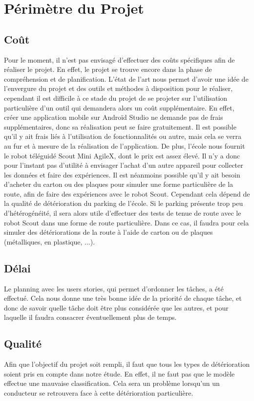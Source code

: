 \section{Périmètre du Projet}

\subsection{Coût}
Pour le moment, il n'est pas envisagé d'effectuer des coûts spécifiques afin de
réaliser le projet. En effet,
le projet se trouve encore dans la phase de compréhension et de planification.
L'état de l'art nous permet
d'avoir une idée de l'envergure du projet et des outils et méthodes à
disposition pour le réaliser, cependant
il est difficile à ce stade du projet de se projeter sur l'utilisation
particulière d'un outil qui demandera alors
un coût supplémentaire.
En effet, créer une application mobile sur Androïd Studio ne demande pas de
frais supplémentaires, donc
sa réalisation peut se faire gratuitement. Il est possible qu'il y ait frais
liés à l'utilisation de fonctionnalités
ou autre, mais cela se verra au fur et à mesure de la réalisation de
l'application.
De plus, l'école nous fournit le robot téléguidé Scout Mini AgileX, dont le
prix est assez élevé. Il n'y a
donc pour l'instant pas d'utilité à envisager l'achat d'un autre appareil pour
collecter les données et faire
des expériences.
Il est néanmoins possible qu'il y ait besoin d'acheter du carton ou des plaques
pour simuler une forme
particulière de la route, afin de faire des expériences avec le robot Scout.
Cependant cela dépend de la
qualité de détérioration du parking de l'école. Si le parking présente trop peu
d'hétérogénéité, il sera alors
utile d'effectuer des tests de tenue de route avec le robot Scout dans une
forme de route particulière. Dans
ce cas, il faudra pour cela simuler des détériorations de la route à l'aide de
carton ou de plaques
(métalliques, en plastique, ...).
\subsection{Délai}
Le planning avec les users stories, qui permet d'ordonner les tâches, a été
effectué. Cela nous donne une
très bonne idée de la priorité de chaque tâche, et donc de savoir quelle tâche
doit être plus considérée que
les autres, et pour laquelle il faudra consacrer éventuellement plus de temps.
\subsection{Qualité}
Afin que l'objectif du projet soit rempli, il faut que tous les types
de
détérioration soient pris en
compte dans notre étude. En effet, il ne faut pas que le modèle effectue une mauvaise classification.
Cela sera un problème lorsqu'un un conducteur se retrouvera face à cette
détérioration particulière.